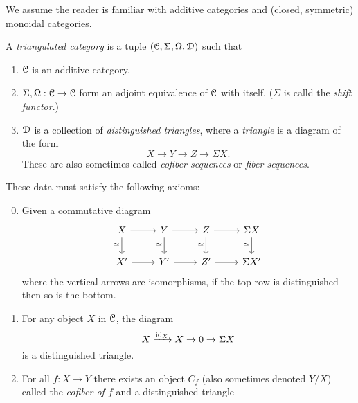 \documentclass[../main.tex]{subfiles}
\begin{document}
We assume the reader is familiar with additive categories and (closed, symmetric) monoidal categories.

\begin{definition}
    A \emph{triangulated category} is a tuple $(\mathcal C,\Sigma,\Omega,\mathcal D)$ such that\begin{enumerate}
        \item $\mathcal C$ is an additive category.
        \item $\Sigma,\Omega:\mathcal C\to\mathcal C$ form an adjoint equivalence of $\mathcal C$ with itself. ($\Sigma$ is calld the \emph{shift functor}.)
        \item $\mathcal D$ is a collection of \emph{distinguished triangles}, where a \emph{triangle} is a diagram of the form
        \[X\to Y\to Z\to\Sigma X.\]
        These are also sometimes called \emph{cofiber sequences} or \emph{fiber sequences}.
    \end{enumerate}
    These data must satisfy the following axioms:
    \begin{enumerate}[label={\textbf{TR\arabic*}}]
        \setcounter{enumi}{-1}
        \item Given a commutative diagram
        \[\begin{tikzcd}
            X & Y & Z & {\Sigma X} \\
            {X'} & {Y'} & {Z'} & {\Sigma X'}
            \arrow[from=1-1, to=1-2]
            \arrow[from=1-2, to=1-3]
            \arrow[from=1-3, to=1-4]
            \arrow["\cong"', from=1-1, to=2-1]
            \arrow[from=2-1, to=2-2]
            \arrow[from=2-2, to=2-3]
            \arrow[from=2-3, to=2-4]
            \arrow["\cong"', from=1-2, to=2-2]
            \arrow["\cong"', from=1-3, to=2-3]
            \arrow["\cong"', from=1-4, to=2-4]
        \end{tikzcd}\]
        where the vertical arrows are isomorphisms, if the top row is distinguished then so is the bottom.
        \item For any object $X$ in $\mathcal C$, the diagram
        \[X\xrightarrow{\mathrm{id}_X}X\to0\to\Sigma X\]
        is a distinguished triangle.
        \item For all $f:X\to Y$ there exists an object $C_f$ (also sometimes denoted $Y/X$) called the \emph{cofiber of $f$} and a distinguished triangle

\end{enumerate}
\end{definition}
\end{document}
